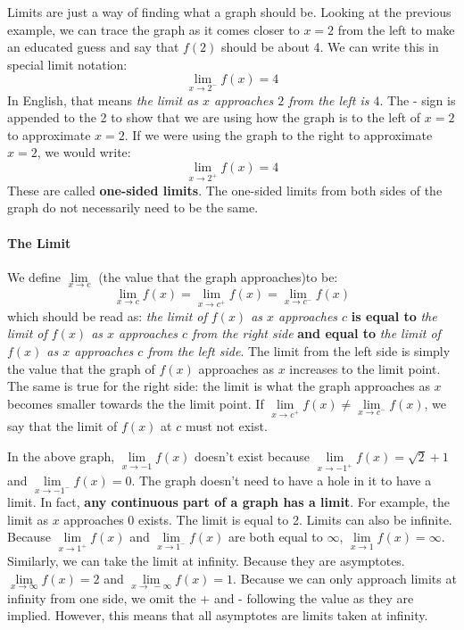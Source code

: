 \documentclass[../revisedMain.tex]{subfiles}
\begin{document}
	\par 	Limits are just a way of finding what a graph should be. Looking at the previous example, we can trace the graph as it comes closer to $x=2$ from the left to make an educated guess and say that $f(2)$ should be about 4. We can write this in special limit notation: $$\lim_{x\to 2^-} f(x) = 4$$ In English, that means \textit{the limit as $x$ approaches $2$ from the left is $4$}. The - sign is appended to the 2 to show that we are using how the graph is to the left of $x=2$ to approximate $x=2$. If we were using the graph to the right to approximate $x=2$, we would write: $$\lim_{x\to 2^+} f(x) = 4$$ These are called \textbf{one-sided limits}. The one-sided limits from both sides of the graph do not necessarily need to be the same.
	\paragraph{The Limit} We define $\lim\limits_{x\to c}$ (the value that the graph approaches)to be:$$\lim_{x\to c} f(x) = \lim_{x\to c^+} f(x) =\lim_{x\to c^-} f(x)$$ which should be read as: \textit{the limit of $f(x)$ as $x$ approaches $c$} \textbf{is equal to} \textit{the limit of $f(x)$ as $x$ approaches $c$ from the right side} \textbf{and equal to} \textit{the limit of $f(x)$ as $x$ approaches $c$ from the left side}. The limit from the left side is simply the value that the graph of $f(x)$ approaches as $x$ increases to the limit point. The same is true for the right side: the limit is what the graph approaches as $x$ becomes smaller towards the the limit point. If $\lim\limits_{x\to c^+} f(x) \neq\lim\limits_{x\to c^-} f(x)$, we say that the limit of $f(x)$ at $c$ must not exist.
	\begin{center}
	\end{center}
	In the above graph, $\lim\limits_{x\to -1} f(x)$ doesn't exist because $\lim\limits_{x\to -1^+} f(x)=\sqrt{2}+1$ and $\lim\limits_{x\to -1^-} f(x)=0$. The graph doesn't need to have a hole in it to have a limit. In fact, \textbf{any continuous part of a graph has a limit}. For example, the limit as $x$ approaches 0 exists. The limit is equal to 2. Limits can also be infinite. Because $\lim\limits_{x\to 1^+} f(x)$ and $\lim\limits_{x\to 1^-} f(x)$ are both equal to $\infty$, $\lim\limits_{x\to 1} f(x)= \infty$. Similarly, we can take the limit at infinity. Because they are asymptotes. $\lim\limits_{x\to\infty} f(x) = 2$ and $\lim\limits_{x\to\ -\infty} f(x) = 1$. Because we can only approach limits at infinity from one side, we omit the + and - following the value as they are implied. However, this means that all asymptotes are limits taken at infinity.
\end{document}
